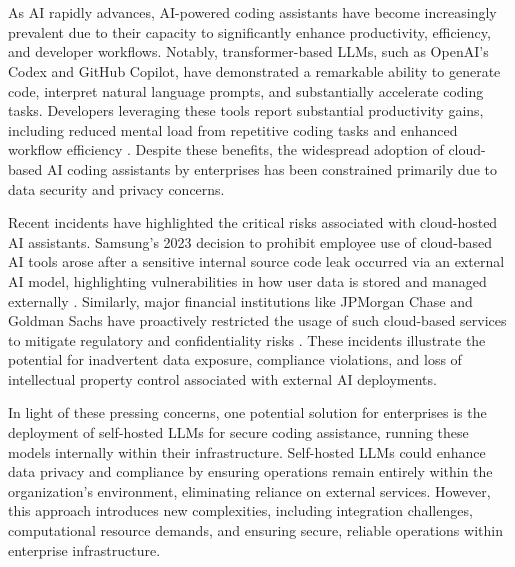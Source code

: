 \chapter{}%
\label{ch:inleiding}

As \gls{AI} rapidly advances, \gls{AI}-powered coding assistants have become increasingly prevalent due to their capacity to significantly enhance productivity, efficiency, and developer workflows. Notably, transformer-based \glspl{LLM}, such as OpenAI's Codex and GitHub Copilot, have demonstrated a remarkable ability to generate code, interpret natural language prompts, and substantially accelerate coding tasks. Developers leveraging these tools report substantial productivity gains, including reduced mental load from repetitive coding tasks and enhanced workflow efficiency \autocite{Microsoft2023Copilot}. Despite these benefits, the widespread adoption of cloud-based \gls{AI} coding assistants by enterprises has been constrained primarily due to data security and privacy concerns.

Recent incidents have highlighted the critical risks associated with cloud-hosted \gls{AI} assistants. Samsung's 2023 decision to prohibit employee use of cloud-based \gls{AI} tools arose after a sensitive internal source code leak occurred via an external \gls{AI} model, highlighting vulnerabilities in how user data is stored and managed externally \autocite{Park2023Samsung}. Similarly, major financial institutions like JPMorgan Chase and Goldman Sachs have proactively restricted the usage of such cloud-based services to mitigate regulatory and confidentiality risks \autocite{Kessel2024}. These incidents illustrate the potential for inadvertent data exposure, compliance violations, and loss of intellectual property control associated with external \gls{AI} deployments.

In light of these pressing concerns, one potential solution for enterprises is the deployment of self-hosted \glspl{LLM} for secure coding assistance, running these models internally within their infrastructure. Self-hosted \glspl{LLM} could enhance data privacy and compliance by ensuring operations remain entirely within the organization's environment, eliminating reliance on external services. However, this approach introduces new complexities, including integration challenges, computational resource demands, and ensuring secure, reliable operations within enterprise infrastructure.


